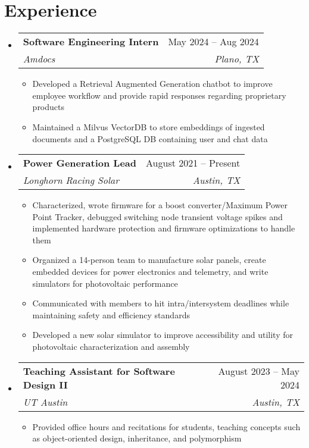 \documentclass[letterpaper,11pt]{article}
\makeatletter
\newcommand{\resumeItem}[1]{
  \item\small{
    {#1 \vspace{-2pt}}
  }
}
\newcommand{\resumeSubheading}[4]{
  \vspace{-2pt}\item
    \begin{tabular*}{0.97\textwidth}[t]{l@{\extracolsep{\fill}}r}
      \textbf{#1} & #2 \\
      \textit{\small#3} & \textit{\small #4} \\
    \end{tabular*}\vspace{-7pt}
}
\newcommand{\resumeSubHeadingListStart}{\begin{itemize}[leftmargin=0.15in, label={}]}
\newcommand{\resumeSubHeadingListEnd}{\end{itemize}}
\newcommand{\resumeItemListStart}{\begin{itemize}}
\newcommand{\resumeItemListEnd}{\end{itemize}\vspace{-5pt}}
\makeatother
\begin{document}
\section{Experience}
  \resumeSubHeadingListStart
    \resumeSubheading
      {Software Engineering Intern}{May 2024 -- Aug 2024}
      {Amdocs}{Plano, TX}
      \resumeItemListStart
        \resumeItem{Developed a Retrieval Augmented Generation chatbot to improve employee workflow and provide rapid responses regarding proprietary products}
        \resumeItem{Maintained a Milvus VectorDB to store embeddings of ingested documents and a PostgreSQL DB containing user and chat data}
      \resumeItemListEnd

    \resumeSubheading
      {Power Generation Lead}{August 2021 -- Present}
      {Longhorn Racing Solar}{Austin, TX}
      \resumeItemListStart
        \resumeItem{Characterized, wrote firmware for a boost converter/Maximum Power Point Tracker, debugged switching node transient voltage spikes and implemented hardware protection and firmware optimizations to handle them}
        \resumeItem{Organized a 14-person team to manufacture solar panels, create embedded devices for power electronics and telemetry, and write simulators for photovoltaic performance}
        \resumeItem{Communicated with members to hit intra/intersystem deadlines while maintaining safety and efficiency standards}
        \resumeItem{Developed a new solar simulator to improve accessibility and utility for photovoltaic characterization and assembly}
      \resumeItemListEnd

    \resumeSubheading
      {Teaching Assistant for Software Design II}{August 2023 -- May 2024}
      {UT Austin}{Austin, TX}
      \resumeItemListStart
        \resumeItem{Provided office hours and recitations for students, teaching concepts such as object-oriented design, inheritance, and polymorphism}
      \resumeItemListEnd

  \resumeSubHeadingListEnd


\end{document}
